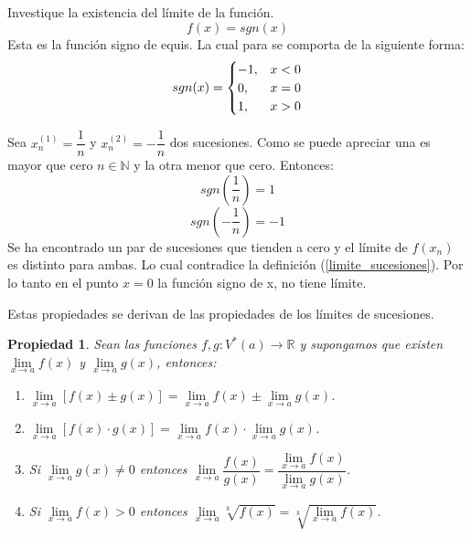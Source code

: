 \documentclass[10pt,twoside]{SelfArx} %
\begin{document}
\begin{ejemplo}\label{ejemplo_signo_suceciones}
	Investique la existencia del límite de la función.
	\[ f(x)=sgn (x) \]
	Esta es la función signo de equis. La cual para se comporta de la siguiente forma:
	\[ sgn (x)=
\begin{cases}
	-1, & \mbox{$ x<0 $}\\
	0, &	\mbox{$ x=0 $}\\
	1, &	\mbox{$ x>0 $}
	
\end{cases}
\]
	 
	 Sea $ x_{n}^{(1)}=\dfrac{1}{n} $ y $ x_{n}^{(2)}=-\dfrac{1}{n} $ dos sucesiones. Como se puede apreciar una es mayor que cero $ n\in\mathbb{N} $ y la otra menor que cero. Entonces:
	 \[ sgn\left ( \dfrac{1}{n}\right )=1 \]
	 \[ sgn\left ( -\dfrac{1}{n}\right )=-1 \]
	 Se ha encontrado un par de sucesiones que tienden a cero y el límite de $ f(x_{n}) $ es distinto para ambas. Lo cual contradice la definición (\ref{limite_sucesiones}).
	 Por lo tanto en el punto $ x=0 $ la función signo de x, no tiene límite.
	 
	
	 
\end{ejemplo}

Estas propiedades se derivan de las propiedades de los límites de sucesiones.


\newtheorem{propiedad}{Propiedad}
\begin{propiedad}
Sean las funciones $ f,g:V^{*}(a)\rightarrow\mathbb{R} $ y supongamos que existen $ \lim\limits_{x\rightarrow a}f(x) $ y $ \lim\limits_{x\rightarrow a}g(x) $, entonces:\\
\begin{enumerate}
	\item[a)] 	$ \lim\limits_{x\rightarrow a}[f(x)\pm g(x)]=\lim\limits_{x\rightarrow a}f(x)\pm\lim\limits_{x\rightarrow a}g(x) $.
	
	
	\item[b)] 	$ \lim\limits_{x\rightarrow a}[f(x)\cdot g(x)]=\lim\limits_{x\rightarrow a}f(x)\cdot\lim\limits_{x\rightarrow a}g(x) $.
	
	
	\item[c)]	Si $ \lim\limits_{x\rightarrow a}g(x)\neq0 $ entonces $ \lim\limits_{x\rightarrow a}\dfrac{f(x)}{g(x)}=\dfrac{\lim\limits_{x\rightarrow a}f(x)}{\lim\limits_{x\rightarrow a}g(x)} $.
	
	
	\item[d)] 	Si $ \lim\limits_{x\rightarrow a}f(x)>0 $ entonces $ \lim\limits_{x\rightarrow a}\sqrt[k]{f(x)}=\sqrt[k]{\lim\limits_{x\rightarrow a}f(x)} $.
\end{enumerate}	
\end{propiedad}
	
\end{document}
